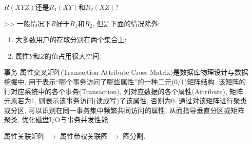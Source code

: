 $R(XYZ)$还是$R_1(XY)$和$R_2(XZ)$?

>> 一般情况下$R$好于$R_1$和$R_2$, 但是下面的情况除外:
\begin{enumerate}
    \item 大多数用户的存取分别在两个集合上;
    \item 属性$Y$和$Z$的值占用很大空间.
\end{enumerate}

事务-属性交叉矩阵(Transaction-Attribute Cross Matrix)是数据库物理设计与数据挖掘中, 
用于表示“哪个事务访问了哪些属性”的一种二元(0/1)矩阵结构. 
该矩阵的行对应系统中的各个事务(Transaction), 
列对应数据的各个属性(Attribute), 矩阵元素若为1, 则表示该事务访问(读或写)了该属性, 否则为0. 
通过对该矩阵进行聚类或分区, 可以识别在同一事务集中频繁共同访问的属性, 
从而指导垂直分区或矩阵聚类, 优化磁盘I/O与事务并发性能.

属性关联矩阵 $\to$ 属性带权关联图 $\to$ 图分割.

